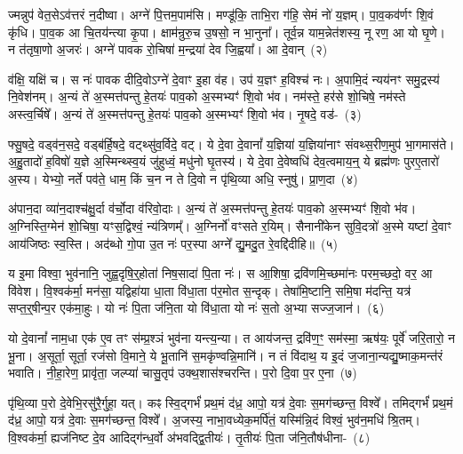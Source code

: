 ज्मन्नुप॑ वेत॒से\-ऽव॑त्तरं न॒दीष्वा। अग्ने॑ पि॒त्तम॒पाम॑सि। मण्डू॑कि॒ ताभि॒रा ग॑हि॒ सेमं नो॑ य॒ज्ञम्। पा॒व॒कव॑र्णꣳ शि॒वं कृ॑धि। पा॒व॒क आ चि॒तय॑न्त्या कृ॒पा। क्षाम॑न्रुरु॒च उ॒षसो॒ न भा॒नुना᳚। तूर्व॒न्न याम॒न्नेत॑शस्य॒ नू रण॒ आ यो घृ॒णे। न त॑तृषा॒णो अ॒जरः॑। अग्ने॑ पावक रो॒चिषा॑ म॒न्द्रया॑ देव जि॒ह्वया᳚। आ दे॒वान्~(२)

व॑क्षि॒ यक्षि॑ च। स नः॑ पावक दीदि॒वो\-ऽग्ने॑ दे॒वाꣳ इ॒हा व॑ह। उप॑ य॒ज्ञꣳ ह॒विश्च॑ नः। अ॒पामि॒दं न्यय॑नꣳ समु॒द्रस्य॑ नि॒वेश॑नम्। अ॒न्यं ते॑ अ॒स्मत्त॑पन्तु हे॒तयः॑ पाव॒को अ॒स्मभ्यꣳ॑ शि॒वो भ॑व। नम॑स्ते॒ हर॑से शो॒चिषे॒ नम॑स्ते अस्त्व॒र्चिषे᳚। अ॒न्यं ते॑ अ॒स्मत्त॑पन्तु हे॒तयः॑ पाव॒को अ॒स्मभ्यꣳ॑ शि॒वो भ॑व। नृ॒षदे॒ वड॑-~(३)

फ्सु॒षदे॒ वड्व॑न॒सदे॒ वड्ब॑र्\mbox{}हि॒षदे॒ वट्थ्सु॑व॒र्विदे॒ वट्। ये दे॒वा दे॒वानां᳚ य॒ज्ञिया॑ य॒ज्ञिया॑नाꣳ संवथ्स॒रीण॒मुप॑ भा॒गमास॑ते। अ॒हु॒तादो॑ ह॒विषो॑ य॒ज्ञे अ॒स्मिन्थ्स्व॒यं जु॑हुध्वं॒ मधु॑नो घृ॒तस्य॑। ये दे॒वा दे॒वेष्वधि॑ देव॒त्वमाय॒न्॒ ये ब्रह्म॑णः पुरए॒तारो॑ अ॒स्य। येभ्यो॒ नर्ते पव॑ते॒ धाम॒ किं च॒न न ते दि॒वो न पृ॑थि॒व्या अधि॒ स्नुषु॑। प्रा॒ण॒दा~(४)

अ॑पान॒दा व्या॑न॒दाश्च॑क्षु॒र्दा व॑र्चो॒दा व॑रिवो॒दाः। अ॒न्यं ते॑ अ॒स्मत्त॑पन्तु हे॒तयः॑ पाव॒को अ॒स्मभ्यꣳ॑ शि॒वो भ॑व। अ॒ग्निस्ति॒ग्मेन॑ शो॒चिषा॒ यꣳस॒द्विश्वं॒ न्य॑त्रिणम्᳚। अ॒ग्निर्नो॑ वꣳसते र॒यिम्। सैनानी॑केन सुवि॒दत्रो॑ अ॒स्मे यष्टा॑ दे॒वाꣳ आय॑जिष्ठः स्व॒स्ति। अद॑ब्धो गो॒पा उ॒त नः॑ पर॒स्पा अग्ने᳚ द्यु॒मदु॒त रे॒वद्दि॑दीहि॥~(५)

{\anuvakamend[{उप॑ दे॒वान् वट्प्रा॑ण॒दाश्चतु॑श्चत्वारिꣳशच्च}]}%

य इ॒मा विश्वा॒ भुव॑नानि॒ जुह्व॒दृषि॒र्॒\mbox{}होता॑ निष॒सादा॑ पि॒ता नः॑। स आ॒शिषा॒ द्रवि॑णमि॒च्छमा॑नः परम॒च्छदो॒ वर॒ आ वि॑वेश। वि॒श्वक॑र्मा॒ मन॑सा॒ यद्विहा॑या धा॒ता वि॑धा॒ता प॑र॒मोत स॒न्दृक्। तेषा॑मि॒ष्टानि॒ समि॒षा म॑दन्ति॒ यत्र॑ सप्त॒र्॒\mbox{}षीन्प॒र एक॑मा॒हुः। यो नः॑ पि॒ता ज॑नि॒ता यो वि॑धा॒ता यो नः॑ स॒तो अ॒भ्या सज्ज॒जान॑।~(६)

यो दे॒वानां᳚ नाम॒धा एक॑ ए॒व तꣳ स॑म्प्र॒श्ञं भुव॑ना यन्त्य॒न्या। त आय॑जन्त॒ द्रवि॑ण॒ꣳ॒ सम॑स्मा॒ ऋष॑यः॒ पूर्वे॑ जरि॒तारो॒ न भू॒ना। अ॒सूर्ता॒ सूर्ता॒ रज॑सो वि॒माने॒ ये भू॒तानि॑ स॒मकृ॑ण्वन्नि॒मानि॑। न तं वि॑दाथ॒ य इ॒दं ज॒जाना॒न्यद्यु॒ष्माक॒मन्त॑रं भवाति। नी॒हा॒रेण॒ प्रावृ॑ता॒ जल्प्या॑ चासु॒तृप॑ उक्थ॒शास॑श्चरन्ति। प॒रो दि॒वा प॒र ए॒ना~(७)

पृ॑थि॒व्या प॒रो दे॒वेभि॒रसु॑रै॒र्गुहा॒ यत्। कꣴ स्वि॒द्गर्भं॑ प्रथ॒मं द॑ध्र॒ आपो॒ यत्र॑ दे॒वाः स॒मग॑च्छन्त॒ विश्वे᳚। तमिद्गर्भं॑ प्रथ॒मं द॑ध्र॒ आपो॒ यत्र॑ दे॒वाः स॒मग॑च्छन्त॒ विश्वे᳚। अ॒जस्य॒ नाभा॒वध्येक॒मर्पि॑तं॒ यस्मि॑न्नि॒दं विश्वं॒ भुव॑न॒\-मधि॑ श्रि॒तम्। वि॒श्वक॑र्मा॒ ह्यज॑निष्ट दे॒व आदिद्ग॑न्ध॒र्वो अ॑भवद्द्वि॒तीयः॑। तृ॒तीयः॑ पि॒ता ज॑नि॒तौष॑धीना-~(८)

